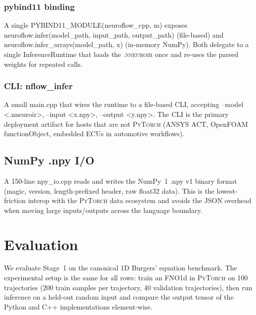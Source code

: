 \documentclass[10pt,twocolumn]{article}
\renewcommand{\texttt}[1]{{\normalfont\ttfamily #1}\normalfont\rmfamily}
\newcommand{\nneuroir}{\textsc{.nneuroir}}
\newcommand{\py}{\textsc{PyTorch}}
\begin{document}
\subsubsection{pybind11 binding}

A single \texttt{PYBIND11\_MODULE(neuroflow\_cpp, m)} exposes
\texttt{neuroflow.infer(model\_path, input\_path, output\_path)}
(file-based) and \texttt{neuroflow.infer\_arrays(model\_path, x)}
(in-memory NumPy).  Both delegate to a single
\texttt{InferenceRuntime} that loads the \nneuroir{} once and
re-uses the parsed weights for repeated calls.

\subsubsection{CLI: \texttt{nflow\_infer}}

A small \texttt{main.cpp} that wires the runtime to a file-based
CLI, accepting \texttt{--model <.nneuroir>}, \texttt{--input
<x.npy>}, \texttt{--output <y.npy>}.  The CLI is the primary
deployment artifact for hosts that are not \py{} (ANSYS ACT,
OpenFOAM \texttt{functionObject}, embedded ECUs in automotive
workflows).

\subsection{NumPy \texttt{.npy} I/O}

A 150-line \texttt{npy\_io.cpp} reads and writes the NumPy~1
\texttt{.npy} v1 binary format (magic, version, length-prefixed
header, raw float32 data).  This is the lowest-friction interop
with the \py{} data ecosystem and avoids the JSON overhead when
moving large inputs/outputs across the language boundary.

\section{Evaluation}
\label{sec:eval}

We evaluate Stage~1 on the canonical 1D Burgers' equation
benchmark.  The experimental setup is the same for all rows:
train an FNO1d in \py{} on 100 trajectories (200 train samples
per trajectory, 40 validation trajectories), then run inference
on a held-out random input and compare the output tensor of the
Python and C{++} implementations element-wise.
\end{document}
